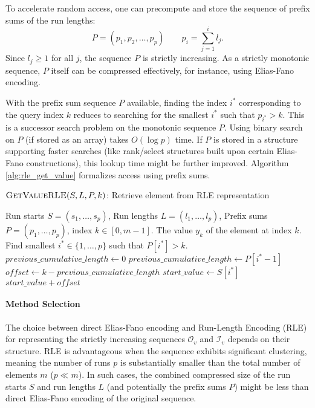 To accelerate random access, one can precompute and store the sequence of prefix sums of the run lengths:
\[ P = (p_1, p_2, \dots, p_p) \qquad  p_i = \sum_{j=1}^{i} l_j. \]
Since $l_j \ge 1$ for all $j$, the sequence $P$ is strictly increasing. As a strictly monotonic sequence, $P$ itself can be compressed effectively, for instance, using Elias-Fano encoding.

With the prefix sum sequence $P$ available, finding the index $i^*$ corresponding to the query index $k$ reduces to searching for the smallest $i^*$ such that $p_{i^*} > k$. This is a successor search problem on the monotonic sequence $P$. Using binary search on $P$ (if stored as an array) takes $O(\log p)$ time. If $P$ is stored in a structure supporting faster searches (like rank/select structures built upon certain Elias-Fano constructions), this lookup time might be further improved. Algorithm \ref{alg:rle_get_value} formalizes access using prefix sums.

\begin{algorithm}[htbp] %
    \caption{$\textsc{GetValueRLE}(S, L, P, k)$: Retrieve element from RLE representation} %
    \label{alg:rle_get_value}
    \small
    \begin{algorithmic}[1]
        \Require Run starts $S=(s_1,\dots,s_p)$, Run lengths $L=(l_1,\dots,l_p)$, Prefix sums $P=(p_1, \dots, p_p)$, index $k \in [0, m-1]$.
        \Ensure The value $y_k$ of the element at index $k$.
        \State Find smallest $i^* \in \{1, \dots, p\}$ such that $P[i^*] > k$.
        \State $previous\_cumulative\_length \leftarrow 0$
        \Else
        \State $previous\_cumulative\_length \leftarrow P[i^*-1]$
        \EndIf
        \State $offset \leftarrow k - previous\_cumulative\_length$
        \State $start\_value \leftarrow S[i^*]$
        \State \Return $start\_value + offset$
    \end{algorithmic}
\end{algorithm}

\paragraph{Method Selection}
The choice between direct Elias-Fano encoding and Run-Length Encoding (RLE) for representing the strictly increasing sequences $\mathcal{O}_v$ and $\mathcal{I}_v$ depends on their structure. RLE is advantageous when the sequence exhibits significant clustering, meaning the number of runs $p$ is substantially smaller than the total number of elements $m$ ($p \ll m$). In such cases, the combined compressed size of the run starts $S$ and run lengths $L$ (and potentially the prefix sums $P$) might be less than direct Elias-Fano encoding of the original sequence.

